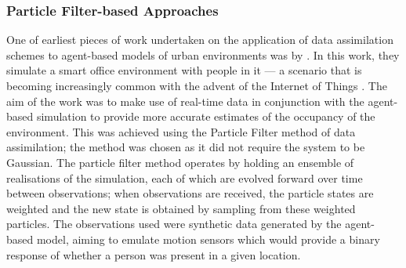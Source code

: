 
\subsubsection{Particle Filter-based Approaches}\label{subs:lit_rev:da_abm:pf}

One of earliest pieces of work undertaken on the application of data
assimilation schemes to agent-based models of urban environments was by
\citet{wang2013data}.
In this work, they simulate a smart office environment with people in it --- a
scenario that is becoming increasingly common with the advent of the Internet of
Things \citep{zanella2014internet}.
The aim of the work was to make use of real-time data in conjunction with the
agent-based simulation to provide more accurate estimates of the occupancy of
the environment.
This was achieved using the Particle Filter method of data assimilation; the
method was chosen as it did not require the system to be Gaussian.
The particle filter method operates by holding an ensemble of realisations of
the simulation, each of which are evolved forward over time between
observations; when observations are received, the particle states are weighted
and the new state is obtained by sampling from these weighted particles.
The observations used were synthetic data generated by the agent-based model,
aiming to emulate motion sensors which would provide a binary response of
whether a person was present in a given location.


